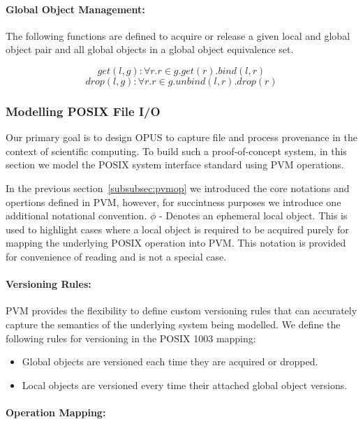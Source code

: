 \documentclass[withindex,glossary]{cam-thesis}
\begin{document}
\paragraph{Global Object Management:}
The following functions are defined to acquire or release a given local and global object pair and all global objects in a global object equivalence set.

$$get(l, g):\forall r.r \in g.get(r).bind(l,r)$$
$$drop(l, g):\forall r.r \in g.unbind(l, r).drop(r)$$


\subsubsection{Modelling POSIX File I/O}
Our primary goal is to design OPUS to capture file and process provenance in the context of scientific computing.
To build such a proof-of-concept system, in this section we model the POSIX system interface standard using PVM operations.

In the previous section~\ref{subsubsec:pvmop} we introduced the core notations and opertions defined in PVM, however, for succintness purposes we introduce one additional notational convention.
$\phi$ - Denotes an ephemeral local object. This is used to highlight cases where a local object is required to be acquired purely for mapping the underlying POSIX operation into PVM.
This notation is provided for convenience of reading and is not a special case.

\paragraph{Versioning Rules:}
PVM provides the flexibility to define custom versioning rules that can accurately capture the semantics of the underlying system being modelled.
We define the following rules for versioning in the POSIX 1003 mapping:

\begin{itemize}
\item Global objects are versioned each time they are acquired or dropped.
\item Local objects are versioned every time their attached global object versions.
\end{itemize}

\paragraph{Operation Mapping:} 
\end{document}
